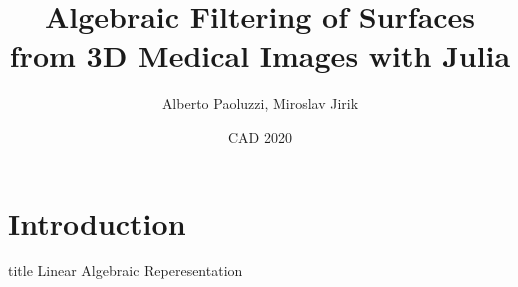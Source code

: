 \documentclass[10pt]{beamer}
\title[Your Short Title]{Algebraic Filtering of Surfaces from 3D Medical Images with Julia}
\author{Alberto Paoluzzi, Miroslav Jirik}
\institute{Roma Tre University, Charles University}
\date{CAD 2020}
\begin{document}
\begin{frame}
  \titlepage
\end{frame}




\section{Introduction}



\begin{frame}{}
\vfill
\centering

\begin{beamercolorbox}[sep=8pt,center,shadow=true,rounded=true]{title}
    Linear Algebraic Reperesentation
\end{beamercolorbox}
\vfill
    
\end{frame}
\end{document}
